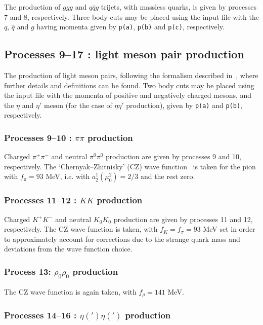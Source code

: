 \documentclass[12pt]{article}
\begin{document}
The production of $ggg$ and $q\overline{q}g$ trijets, with massless quarks, is given by processes 7 and 8, respectively. Three body cuts may be placed using the input file with the $q$, $\overline{q}$ and $g$ having momenta given by \texttt{p(a)}, \texttt{p(b)} and \texttt{p(c)}, respectively.

\subsection{Processes 9--17 : light meson pair production}

The production of light meson pairs, following the formalism described in~\cite{HarlandLang:2011qd,Harland-Lang:2013ncy}, where further details and definitions can be found. Two body cuts may be placed using the input file with the momenta of  positive and negatively charged mesons, and the $\eta$ and $\eta'$ meson (for the case of $\eta\eta'$ production), given by  \texttt{p(a)} and \texttt{p(b)}, respectively.

\subsubsection{Processes 9--10 : $\pi\pi$ production}

Charged $\pi^+\pi^-$ and neutral $\pi^0\pi^0$ production are given by processes 9 and 10, respectively. The `Chernyak--Zhitnisky' (CZ) wave function~\cite{Chernyak:1981zz} is taken for the pion with $f_\pi=93$ MeV, i.e. with $a_2^1(\mu_0^2)=2/3$ and the rest zero.

\subsubsection{Processes 11--12 : $KK$ production}

 Charged $K^+K^-$ and neutral $K_0K_0$ production are given by processes 11 and 12, respectively. The CZ wave function is taken, with $f_K=f_\pi=93$ MeV set in order to approximately account for corrections due to the strange quark mass and deviations from the wave function choice.
 
 \subsubsection{Process 13: $\rho_0\rho_0$ production}
 
 The CZ wave function is again taken, with $f_\rho=141$ MeV.
 
 \subsubsection{Processes 14--16 : $\eta(')\eta(')$ production}
\end{document}
